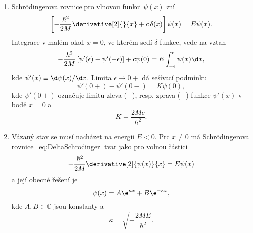 \begin{solution}
	\begin{enumerate}
	\item
		Schrödingerova rovnice pro vlnovou funkci $\psi(x)$ zní 
		\begin{equation}
			\label{eq:DeltaSchrodinger}
            \left[-\frac{\hbar^{2}}{2M}\derivative[2]{}{x}+c\,\delta(x)\right]\psi(x)
                =E\psi(x).
		\end{equation}
		Integrace v malém okolí $x=0$, ve kterém sedí $\delta$ funkce, vede na vztah
		\begin{equation}
			-\frac{\hbar^{2}}{2M}\left[\psi'(\epsilon)-\psi'(-\epsilon)\right]+c\psi(0)
				=E\int_{-\epsilon}^{\epsilon}\psi(x)\d x,
		\end{equation}
		kde $\psi'(x)\equiv\d\psi(x)/\d x$.
		Limita $\epsilon\rightarrow0+$ dá sešívací podmínku
		\begin{equation}
			\label{eq:SewDerivativeDelta}
			\boxed{\psi'(0+)-\psi'(0-)=K\psi(0)},
		\end{equation}
		kde $\psi'(0\pm)$ označuje limitu zleva ($-$), resp. zprava ($+$) funkce $\psi'(x)$ v bodě $x=0$ a
		\begin{equation}\label{eq:DeltaK}
			K=\frac{2Mc}{\hbar^{2}}.
		\end{equation}
        
		
	\item
		Vázaný stav se musí nacházet na energii $E<0$.
		Pro $x\neq0$ má Schrödingerova rovnice~\eqref{eq:DeltaSchrodinger} tvar jako pro volnou částici
		\begin{equation}
            -\frac{\hbar^{2}}{2M}\derivative[2]{\psi(x)}{x}
                =E\psi(x)
		\end{equation}
		a její obecné řešení je
		\begin{equation}
            \psi(x)
                =A\e^{\kappa x}+B\e^{-\kappa x},
		\end{equation}
		kde $A,B\in\mathbb{C}$ jsou konstanty a
		\begin{equation}
			\label{eq:kappa}
			\kappa=\sqrt{-\frac{2ME}{\hbar^{2}}}.
		\end{equation}
		

\end{enumerate}
\end{solution}
